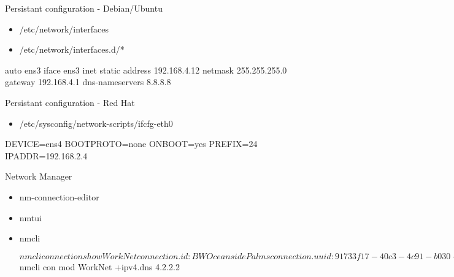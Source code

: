 \cprotect\note{

}


\begin{frame}
   {Persistant configuration - Debian/Ubuntu}
      \begin{itemize}
         \item /etc/network/interfaces
	 \item /etc/network/interfaces.d/*
      \end{itemize}
	\begin{raw}
auto ens3
iface ens3 inet static
        address 192.168.4.12
        netmask 255.255.255.0
        gateway 192.168.4.1
        dns-nameservers 8.8.8.8
	\end{raw}

\end{frame}

\cprotect\note{

}

\begin{frame}
   {Persistant configuration - Red Hat}
      \begin{itemize}
         \item /etc/sysconfig/network-scripts/ifcfg-eth0
      \end{itemize}
	\begin{raw}
DEVICE=ens4
BOOTPROTO=none
ONBOOT=yes
PREFIX=24
IPADDR=192.168.2.4
	\end{raw}


\end{frame}

\cprotect\note{

}

\begin{frame}
   {Network Manager}
      \begin{itemize}
	 \item nm-connection-editor
	 \item nmtui
         \item nmcli
		 \begin{raw}
$ nmcli connection show WorkNet
connection.id:                          BWOceansidePalms
connection.uuid:                        91733f17-40c3-4c91-b030-cde380715e54
connection.stable-id:                   --
connection.type:                        802-11-wireless
....

$ nmcli con mod WorkNet +ipv4.dns 4.2.2.2
		 \end{raw}
      \end{itemize}


\end{frame}

